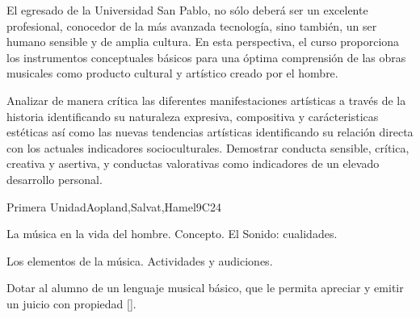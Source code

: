 \begin{syllabus}


\begin{justification}
El egresado de la Universidad San Pablo, no sólo deberá ser un excelente profesional, conocedor de la más avanzada tecnología, sino también, un ser humano sensible y de amplia cultura. En esta perspectiva, el curso proporciona los instrumentos conceptuales básicos para una óptima comprensión de las obras musicales como producto cultural y artístico creado por el hombre.
\end{justification}

\begin{goals}
\item Analizar de manera crítica las diferentes manifestaciones artísticas a través de la historia identificando su naturaleza expresiva, compositiva y carácteristicas estéticas así­ como las nuevas tendencias artísticas identificando su relación directa con los actuales indicadores socioculturales. Demostrar conducta sensible, crítica, creativa y asertiva, y conductas valorativas como indicadores de un elevado desarrollo personal.
\end{goals}

\begin{outcomes}
    \item {}
    \item {}
\end{outcomes}

\begin{competences}
    \item {}
\end{competences}

\begin{unit}{}{Primera Unidad}{Aopland,Salvat,Hamel}{9}{C24}
\begin{topics}
	\item La música en la vida del hombre. Concepto. El Sonido: cualidades.
	\item Los elementos de la música. Actividades y audiciones.
\end{topics}
\begin{learningoutcomes}
	\item Dotar al alumno de un lenguaje musical básico, que le permita apreciar y emitir un juicio con propiedad [\Usage].
\end{learningoutcomes}
\end{unit}


\end{syllabus}
